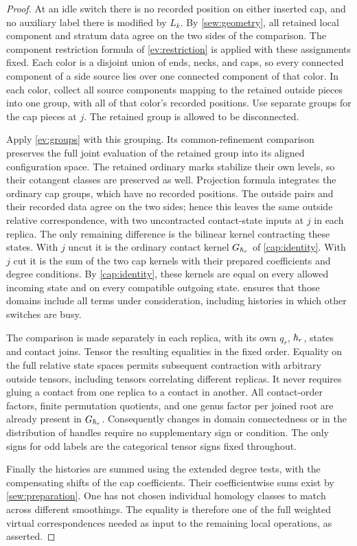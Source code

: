 \begin{proof}
At an idle switch there is no recorded position on either inserted
cap, and no auxiliary label there is modified by $L_k$.  By
\cref{sew:geometry}, all retained local component and stratum data
agree on the two sides of the comparison.  The component restriction
formula of \cref{ev:restriction} is applied with these assignments
fixed.  Each color is a disjoint union of ends, necks, and caps, so
every connected component of a side source lies over one connected
component of that color.  In each color, collect all source components
mapping to the retained outside pieces into one group, with all of
that color's recorded positions.  Use separate groups for the cap
pieces at $j$.  The retained group is allowed to be disconnected.

Apply \cref{ev:groups} with this grouping.  Its common-refinement
comparison preserves the full joint evaluation of the retained group
into its aligned configuration space.  The retained ordinary marks
stabilize their own levels, so their cotangent classes are preserved
as well.  Projection formula integrates the ordinary cap groups,
which have no recorded positions.  The outside pairs and their
recorded data agree on the two sides; hence this leaves the same
outside relative correspondence, with two uncontracted contact-state
inputs at $j$ in each replica.  The only remaining difference is the
bilinear kernel contracting these states.  With $j$ uncut it is the
ordinary contact kernel $G_{\hbar_r}$ of \cref{cap:identity}.  With $j$
cut it is the sum of the
two cap kernels with their prepared coefficients and degree
conditions.  By \cref{cap:identity}, these kernels are equal on every
allowed incoming state and on every compatible outgoing state.
 ensures that those domains include all terms
under consideration, including histories in which other switches
are busy.

The comparison is made separately in each replica, with its own
$q_r$, $\hbar_r$, states and contact joins.  Tensor the resulting
equalities in the fixed order.  Equality on the full relative state
spaces permits subsequent contraction with arbitrary outside
tensors, including tensors correlating different replicas.  It
never requires gluing a contact from one replica to a contact in
another.  All contact-order factors, finite permutation quotients,
and one genus factor per joined root are already present in
$G_{\hbar_r}$.  Consequently changes in domain connectedness or in the
distribution of handles require no supplementary sign or condition.
The only signs for odd labels are the categorical tensor signs fixed
throughout.

Finally the histories are summed using the extended degree tests,
with the compensating shifts of the cap coefficients.  Their
coefficientwise sums exist by \cref{sew:preparation}.  One has not
chosen individual homology classes to match across different
smoothings.  The equality is therefore one of the full weighted
virtual correspondences needed as input to the remaining local
operations, as asserted.
\end{proof}

